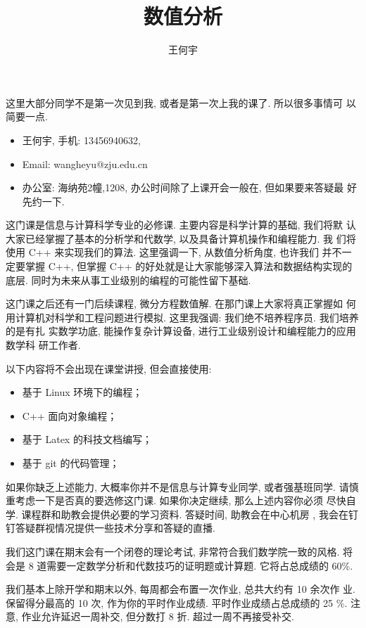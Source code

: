 \documentclass[a4paper]{ctexart}
\title{数值分析}
\author{王何宇}
\date{}
\begin{document}
\maketitle
\pagestyle{empty}

这里大部分同学不是第一次见到我, 或者是第一次上我的课了. 所以很多事情可
以简要一点.

\begin{itemize}
\item 王何宇, 手机: 13456940632,
\item Email: wangheyu@zju.edu.cn
\item 办公室: 海纳苑2幢,1208, 办公时间除了上课开会一般在, 但如果要来答疑最
  好先约一下.
\end{itemize}

这门课是信息与计算科学专业的必修课. 主要内容是科学计算的基础, 我们将默
认大家已经掌握了基本的分析学和代数学, 以及具备计算机操作和编程能力. 我
们将使用 C++ 来实现我们的算法. 这里强调一下, 从数值分析角度, 也许我们
并不一定要掌握 C++, 但掌握 C++ 的好处就是让大家能够深入算法和数据结构实现的底层.
同时为未来从事工业级别的编程的可能性留下基础.

这门课之后还有一门后续课程, 微分方程数值解. 在那门课上大家将真正掌握如
何用计算机对科学和工程问题进行模拟. 这里我强调: 我们绝不培养程序员. 我们培养的是有扎
实数学功底, 能操作复杂计算设备, 进行工业级别设计和编程能力的应用数学科
研工作者.

以下内容将不会出现在课堂讲授, 但会直接使用:
\begin{itemize}
\item 基于 Linux 环境下的编程；
\item C++ 面向对象编程；
\item 基于 Latex 的科技文档编写；
\item 基于 git 的代码管理；
\end{itemize}
如果你缺乏上述能力, 大概率你并不是信息与计算专业同学, 或者强基班同学.
请慎重考虑一下是否真的要选修这门课. 如果你决定继续, 那么上述内容你必须
尽快自学. 课程群和助教会提供必要的学习资料. 答疑时间, 助教会在中心机房
, 我会在钉钉答疑群视情况提供一些技术分享和答疑的直播. 

我们这门课在期末会有一个闭卷的理论考试, 非常符合我们数学院一致的风格.
将会是 8 道需要一定数学分析和代数技巧的证明题或计算题. 它将占总成绩的
60\%.

我们基本上除开学和期末以外, 每周都会布置一次作业, 总共大约有 10 余次作
业. 保留得分最高的 10 次, 作为你的平时作业成绩. 平时作业成绩占总成绩的
25 \%. 注意, 作业允许延迟一周补交, 但分数打 8 折. 超过一周不再接受补交.
\end{document}
